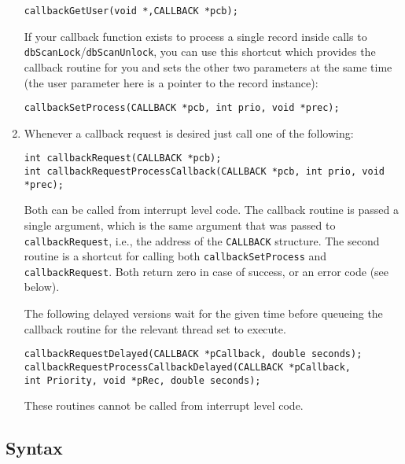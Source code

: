 \begin{enumerate}
\begin{verbatim}
callbackGetUser(void *,CALLBACK *pcb);
\end{verbatim}

If your callback function exists to process a single record inside calls to \verb|dbScanLock|/\verb|dbScanUnlock|, you can use this shortcut which provides the callback routine for you and sets the other two parameters at the same time 
(the user parameter here is a pointer to the record instance):

\begin{verbatim}
callbackSetProcess(CALLBACK *pcb, int prio, void *prec);
\end{verbatim}

\item Whenever a callback request is desired just call one of the following:

\begin{verbatim}
int callbackRequest(CALLBACK *pcb);
int callbackRequestProcessCallback(CALLBACK *pcb, int prio, void *prec);
\end{verbatim}

Both can be called from interrupt level code. The callback routine is passed a single argument, which is the same argument that was passed to \verb|callbackRequest|, i.e., the address of the \verb|CALLBACK| structure. The second routine is a shortcut for calling both \verb|callbackSetProcess| and \verb|callbackRequest|. Both return zero in case of success, or an error code (see below). 

The following delayed versions wait for the given time before queueing the callback routine for the relevant thread set to execute.

\begin{verbatim}
callbackRequestDelayed(CALLBACK *pCallback, double seconds);
callbackRequestProcessCallbackDelayed(CALLBACK *pCallback,
int Priority, void *pRec, double seconds);
\end{verbatim}

These routines cannot be called from interrupt level code.
\end{enumerate}

\subsection{Syntax}

